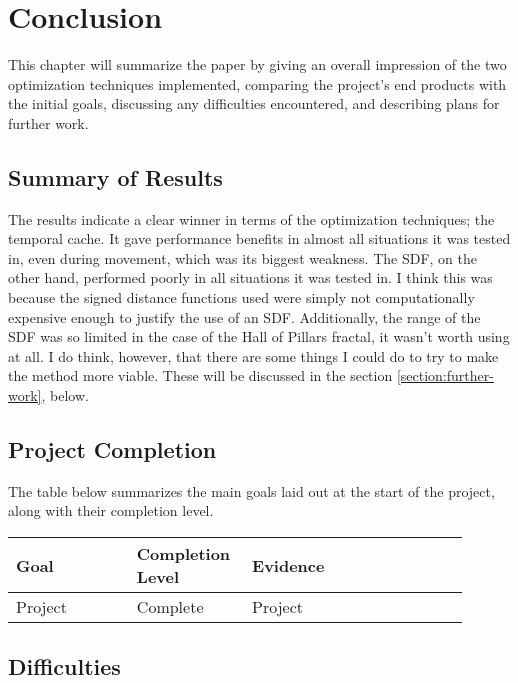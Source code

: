\chapter{Conclusion}
\label{chapter:conclusion}

This chapter will summarize the paper by giving an overall impression of the two optimization techniques implemented, comparing the project's end products with the initial goals, discussing any difficulties encountered, and describing plans for further work.

\section{Summary of Results}

The results indicate a clear winner in terms of the optimization techniques; the temporal cache. It gave performance benefits in almost all situations it was tested in, even during movement, which was its biggest weakness. The SDF, on the other hand, performed poorly in all situations it was tested in. I think this was because the signed distance functions used were simply not computationally expensive enough to justify the use of an SDF. Additionally, the range of the SDF was so limited in the case of the Hall of Pillars fractal, it wasn't worth using at all. I do think, however, that there are some things I could do to try to make the method more viable. These will be discussed in the section \ref{section:further-work}, below.

\section{Project Completion}

The table below summarizes the main goals laid out at the start of the project, along with their completion level.\newline

\begin{tabular}{||p{0.25\linewidth}|p{0.2\linewidth}|p{0.45\linewidth}||}
	\hline
	Goal & Completion Level & Evidence\\
	\hline\hline
	Project & Complete & Project\\
	\hline
\end{tabular}

\section{Difficulties}

